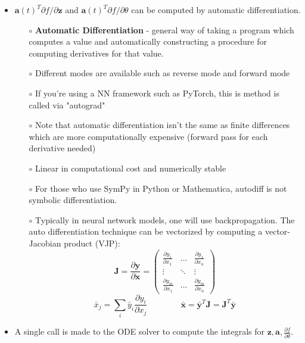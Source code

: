 \documentclass[10pt,a4paper]{article}
\begin{document}
\begin{itemize}
    \item $\textbf{a}(t)^{T} \partial f / \partial \textbf{z}$ and $\textbf{a}(t)^{T} \partial f /  \partial \theta$ can be computed by automatic differentiation. 
    \begin{itemize}
        \item[$\circ$] \textbf{Automatic Differentiation} - general way of taking a program which computes a value and automatically constructing a procedure for computing derivatives for that value. 
        \item[$\circ$] Different modes are available such as reverse mode and forward mode
        \item[$\circ$] If you're using a NN framework such as PyTorch, this is method is called via "autograd"
        \item[$\circ$] Note that automatic differentiation isn't the same as finite differences which are more computationally expensive (forward pass for each derivative needed)
        \item[$\circ$] Linear in computational cost and numerically stable
        \item[$\circ$] For those who use SymPy in Python or Mathematica, autodiff is not symbolic differentiation.
        \item[$\circ$] Typically in neural network models, one will use backpropagation. The auto differentiation technique can be vectorized by computing a vector-Jacobian product (VJP):
        \begin{equation}
            \textbf{J} = \frac{\partial \textbf{y}}{\partial \textbf{x}} = \begin{pmatrix}
            \frac{\partial y_{1}}{\partial x_{1}} & \hdots & \frac{\partial y_{1}}{\partial x_{n}} \\
            \vdots & \ddots & \vdots \\
            \frac{\partial y_{m}}{\partial x_{1}}
            & 
            \hdots &
            \frac{\partial y_{m}}{\partial x_{n}}
            \end{pmatrix}
        \end{equation}
        \begin{equation}
            \bar{x}_{j} = \sum_{i} \bar{y}_{i} \frac{\partial y_{i}}{\partial x_{j}} \quad \quad \quad \quad \bar{\textbf{x}} = \bar{\textbf{y}}^{T} \textbf{J} = \textbf{J}^{T} \bar{\textbf{y}}
        \end{equation}
    \end{itemize}
    \item A single call is made to the ODE solver to compute the integrals for $\textbf{z}, \textbf{a}, \frac{\partial f}{\partial \theta}$. 

\end{itemize}
\end{document}
